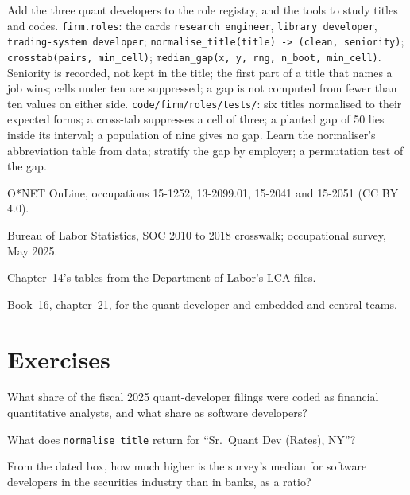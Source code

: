 \begin{build}
 Add the three quant developers to the role registry, and the tools to study titles and codes.
 \texttt{firm.roles}: the cards \texttt{research engineer}, \texttt{library developer},
\texttt{trading-system developer}; \texttt{normalise\_title(title) -> (clean, seniority)};
\texttt{crosstab(pairs, min\_cell)}; \texttt{median\_gap(x, y, rng, n\_boot, min\_cell)}.
 Seniority is recorded, not kept in the title; the first part of a title that names a job wins; cells
under ten are suppressed; a gap is not computed from fewer than ten values on either side.
 \texttt{code/firm/roles/tests/}: six titles normalised to their expected forms; a cross-tab
suppresses a cell of three; a planted gap of 50 lies inside its interval; a population of nine gives no gap.
 Learn the normaliser's abbreviation table from data; stratify the gap by employer; a permutation test
of the gap.
\end{build}

\begin{omsources}
\item O*NET OnLine, occupations 15-1252, 13-2099.01, 15-2041 and 15-2051 (CC BY 4.0).
\item Bureau of Labor Statistics, SOC 2010 to 2018 crosswalk; occupational survey, May 2025.
\item Chapter~14's tables from the Department of Labor's LCA files.
\item Book~16, chapter~21, for the quant developer and embedded and central teams.
\end{omsources}

\section{Exercises}

\begin{exercise}[$\star$]\label{exo:in:quant-developer:1}
What share of the fiscal 2025 quant-developer filings were coded as financial quantitative analysts, and what share as
software developers?
\end{exercise}

\begin{exercise}[$\star$]\label{exo:in:quant-developer:2}
What does \texttt{normalise\_title} return for ``Sr.\ Quant Dev (Rates), NY''?
\end{exercise}

\begin{exercise}[$\star$]\label{exo:in:quant-developer:3}
From the dated box, how much higher is the survey's median for software developers in the securities industry than in
banks, as a ratio?
\end{exercise}

